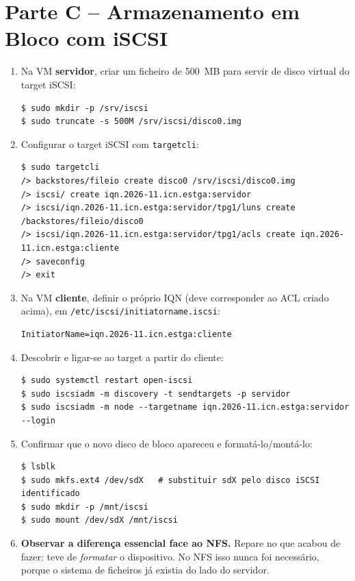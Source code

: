 \documentclass[11pt,a4paper]{article}
\begin{document}
\section{Parte C -- Armazenamento em Bloco com iSCSI}
\begin{enumerate}[label=\arabic*.]
    \item Na VM \textbf{servidor}, criar um ficheiro de 500~MB para servir de disco virtual do target iSCSI:
\begin{lstlisting}
$ sudo mkdir -p /srv/iscsi
$ sudo truncate -s 500M /srv/iscsi/disco0.img
\end{lstlisting}

    \item Configurar o target iSCSI com \texttt{targetcli}:
\begin{lstlisting}
$ sudo targetcli
/> backstores/fileio create disco0 /srv/iscsi/disco0.img
/> iscsi/ create iqn.2026-11.icn.estga:servidor
/> iscsi/iqn.2026-11.icn.estga:servidor/tpg1/luns create /backstores/fileio/disco0
/> iscsi/iqn.2026-11.icn.estga:servidor/tpg1/acls create iqn.2026-11.icn.estga:cliente
/> saveconfig
/> exit
\end{lstlisting}

    \item Na VM \textbf{cliente}, definir o próprio IQN (deve corresponder ao ACL criado acima), em \texttt{/etc/iscsi/initiatorname.iscsi}:
\begin{lstlisting}
InitiatorName=iqn.2026-11.icn.estga:cliente
\end{lstlisting}

    \item Descobrir e ligar-se ao target a partir do cliente:
\begin{lstlisting}
$ sudo systemctl restart open-iscsi
$ sudo iscsiadm -m discovery -t sendtargets -p servidor
$ sudo iscsiadm -m node --targetname iqn.2026-11.icn.estga:servidor --login
\end{lstlisting}

    \item Confirmar que o novo disco de bloco apareceu e formatá-lo/montá-lo:
\begin{lstlisting}
$ lsblk
$ sudo mkfs.ext4 /dev/sdX   # substituir sdX pelo disco iSCSI identificado
$ sudo mkdir -p /mnt/iscsi
$ sudo mount /dev/sdX /mnt/iscsi
\end{lstlisting}

    \item \textbf{Observar a diferença essencial face ao NFS.} Repare no que acabou de fazer: teve de \emph{formatar} o dispositivo. No NFS isso nunca foi necessário, porque o sistema de ficheiros já existia do lado do servidor.


\end{enumerate}
\end{document}
